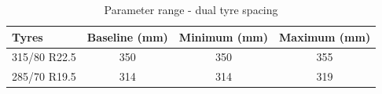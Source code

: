 \begin{table}[H]
	\centering\footnotesize
	\begin{threeparttable}

		\begin{tabulary}{\textwidth}{lccc}
			\toprule
            \textbf{Tyres} & \textbf{Baseline (mm)} & \textbf{Minimum (mm)} & \textbf{Maximum (mm)} \\
			\midrule  
    		
            315/80 R22.5 & 350   & 350   & 355 \\
            285/70 R19.5 & 314   & 314   & 319 \\
			
            \bottomrule
		\end{tabulary}

		\caption{Parameter range - dual tyre spacing}
		\label{table:pr-dual-tyre-spacing}


	\end{threeparttable}
\end{table}
